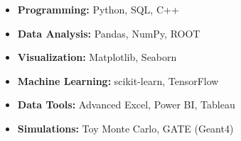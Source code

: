 \noindent {}
\begin{itemize}
  \item \textbf{Programming:} Python, SQL, C++
  \item \textbf{Data Analysis:} Pandas, NumPy, ROOT
  \item \textbf{Visualization:} Matplotlib, Seaborn
  \item \textbf{Machine Learning:} scikit-learn, TensorFlow
  \item \textbf{Data Tools:} Advanced Excel, Power BI, Tableau
  \item \textbf{Simulations:} Toy Monte Carlo, GATE (Geant4)
\end{itemize}